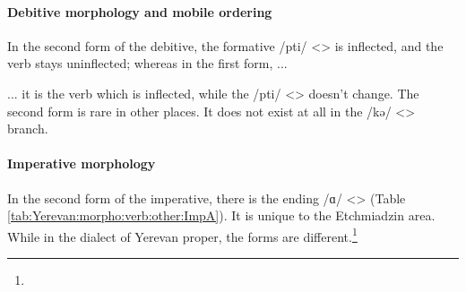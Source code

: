 

\paragraph{Debitive morphology and mobile ordering}

In the second form of the debitive, the formative /pti/ <> is inflected, and the verb stays uninflected; whereas in the first form, ... 

\begin{adjarianpage}\label{page:44}\end{adjarianpage}%

... it is the verb which is inflected, while the /pti/ <> doesn't change. The second form is rare in other places. It does not exist at all in the /kə/ <> branch. 


\paragraph{Imperative morphology}\label{section:yerevan:morpho:verb:details:impertative}
In the second form of the imperative, there is the ending /ɑ/ <> (Table \ref{tab:Yerevan:morpho:verb:other:ImpA}). It is unique to the Etchmiadzin area. While in the dialect of Yerevan proper, the forms are different.\footnote{} 






